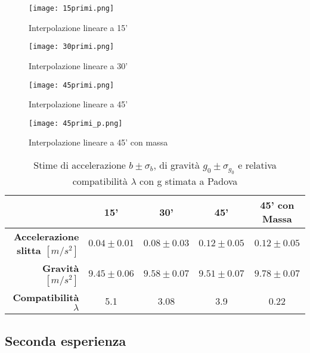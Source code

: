 \documentclass[a4paper,11pt,oneside]{article}
\begin{document}
  


\begin{figure}[h]
    \caption{Interpolazione lineare a 15'}
    \label{fig:g_0_15}
    \centering
           \texttt{[image: 15primi.png]}
\end{figure}

\begin{figure}[h]
    \caption{Interpolazione lineare a 30'}
    \label{fig:g_0_30}
    \centering
           \texttt{[image: 30primi.png]}
\end{figure}

\begin{figure}[h]
    \caption{Interpolazione lineare a 45'}
    \label{fig:g_0_45}
    \centering
           \texttt{[image: 45primi.png]}
\end{figure}

\begin{figure}[h]
    \caption{Interpolazione lineare a 45' con massa}
    \label{fig:g_0_p45}
    \centering
           \texttt{[image: 45primi\_p.png]}
\end{figure}



\begin{table}[]
\caption{Stime di accelerazione $b\pm \sigma_{b}$, di gravità $g_{0} \pm \sigma_{g_{0}}$ e relativa compatibilità $\lambda$ con g stimata a Padova}
\label{tab:stima_b_g}
\begin{tabular}{r|c|c|c|c}
\hline
\multicolumn{1}{l|}{}  & \textbf{15'}              & \textbf{30'}              & \textbf{45'}              & \textbf{45' con Massa}    \\ \hline
\textbf{Accelerazione slitta $[\si{m/s^2}]$} & $0.04\pm0.01$    & $0.08\pm0.03$   & $0.12\pm0.05$    & $0.12\pm0.05$    \\
\textbf{Gravità $[\si{m/s^2}]$}       & $9.45\pm0.06$ & $9.58\pm0.07$ & $9.51\pm0.07$ & $9.78\pm0.07$ \\ 
\textbf{Compatibilità $\lambda$}              &5.1                &3.08           &3.9            &0.22\\ \hline
\end{tabular}
\end{table}



\subsection{Seconda esperienza}
\end{document}
